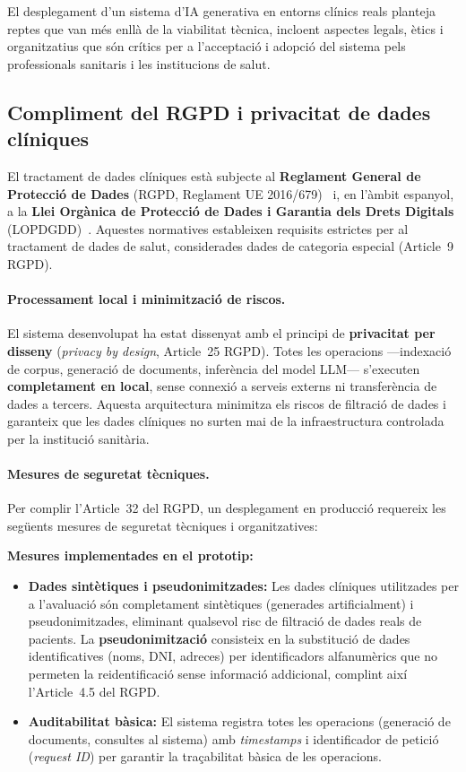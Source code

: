 \documentclass[CAT]{TFUOC}%
\begin{document}
El desplegament d'un sistema d'IA generativa en entorns clínics reals planteja reptes que van més enllà de la viabilitat tècnica, incloent aspectes legals, ètics i organitzatius que són crítics per a l'acceptació i adopció del sistema pels professionals sanitaris i les institucions de salut.

\subsection{Compliment del RGPD i privacitat de dades clíniques}

El tractament de dades clíniques està subjecte al \textbf{Reglament General de Protecció de Dades} (RGPD, Reglament UE 2016/679)~\cite{eu2016gdpr} i, en l'àmbit espanyol, a la \textbf{Llei Orgànica de Protecció de Dades i Garantia dels Drets Digitals} (LOPDGDD)~\cite{spain2018lopdgdd}. Aquestes normatives estableixen requisits estrictes per al tractament de dades de salut, considerades dades de categoria especial (Article~9 RGPD).

\paragraph{Processament local i minimització de riscos.}
El sistema desenvolupat ha estat dissenyat amb el principi de \textbf{privacitat per disseny} (\textit{privacy by design}, Article~25 RGPD). Totes les operacions ---indexació de corpus, generació de documents, inferència del model LLM--- s'executen \textbf{completament en local}, sense connexió a serveis externs ni transferència de dades a tercers. Aquesta arquitectura minimitza els riscos de filtració de dades i garanteix que les dades clíniques no surten mai de la infraestructura controlada per la institució sanitària.

\paragraph{Mesures de seguretat tècniques.}
Per complir l'Article~32 del RGPD, un desplegament en producció requereix les següents mesures de seguretat tècniques i organitzatives:

\textbf{Mesures implementades en el prototip:}
\begin{itemize}
    \item \textbf{Dades sintètiques i pseudonimitzades:} Les dades clíniques utilitzades per a l'avaluació són completament sintètiques (generades artificialment) i pseudonimitzades, eliminant qualsevol risc de filtració de dades reals de pacients. La \textbf{pseudonimització} consisteix en la substitució de dades identificatives (noms, DNI, adreces) per identificadors alfanumèrics que no permeten la reidentificació sense informació addicional, complint així l'Article~4.5 del RGPD.
    
    \item \textbf{Auditabilitat bàsica:} El sistema registra totes les operacions (generació de documents, consultes al sistema) amb \textit{timestamps} i identificador de petició (\textit{request ID}) per garantir la traçabilitat bàsica de les operacions.
\end{itemize}
\end{document}
